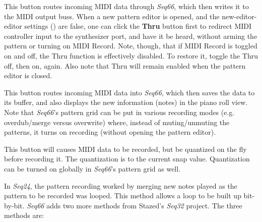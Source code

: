    This button routes incoming MIDI data through
   \textsl{Seq66}, which then writes it to the MIDI output buss.
   When a new pattern editor is opened,
   and the new-editor-editor settings
   ()
   are false, one can click the
   \textbf{Thru} button first to redirect MIDI controller input
   to the synthesizer port, and have it be heard, without
   arming the pattern or turning on MIDI Record.
   Note, though, that if MIDI Record is toggled on and off, the
   Thru function is effectively disabled.  To restore it,
   toggle the Thru off, then on, again.
   Also note that Thru will remain enabled when the pattern editor is closed.

   This button routes incoming MIDI data into
   \textsl{Seq66}, which then saves the data to its buffer, and also
   displays the new information (notes) in the piano roll view.
   Note that \textsl{Seq66}'s pattern grid can be put in various recording
   modes (e.g. overdub/merge versus overwrite) where, instead of
   muting/unmuting the patterns, it turns on recording (without opening the
   pattern editor).

   This button will causes MIDI data to be recorded, but be
   quantized on the fly before recording it.
   The quantization is to the current snap value.
   Quantization can be turned on globally in \textsl{Seq66}'s pattern grid
   as well.

   In \textsl{Seq24}, the pattern recording worked by merging new notes played
   as the pattern to be recorded was looped.  This method allows a loop to be
   built up bit-by-bit.  \textsl{Seq66} adds two more methods from
   Stazed's \textsl{Seq32} project.  The three methods are:

